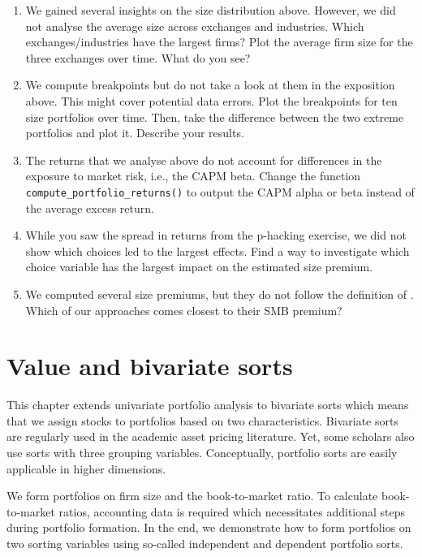 \documentclass[
]{book}
\providecommand{\tightlist}{%
  \setlength{\itemsep}{0pt}\setlength{\parskip}{0pt}}
\begin{document}
\begin{enumerate}
\def\labelenumi{\arabic{enumi}.}
\tightlist
\item
  We gained several insights on the size distribution above. However, we did not analyse the average size across exchanges and industries. Which exchanges/industries have the largest firms? Plot the average firm size for the three exchanges over time. What do you see?
\item
  We compute breakpoints but do not take a look at them in the exposition above. This might cover potential data errors. Plot the breakpoints for ten size portfolios over time. Then, take the difference between the two extreme portfolios and plot it. Describe your results.
\item
  The returns that we analyse above do not account for differences in the exposure to market risk, i.e., the CAPM beta. Change the function \texttt{compute\_portfolio\_returns()} to output the CAPM alpha or beta instead of the average excess return.
\item
  While you saw the spread in returns from the p-hacking exercise, we did not show which choices led to the largest effects. Find a way to investigate which choice variable has the largest impact on the estimated size premium.
\item
  We computed several size premiums, but they do not follow the definition of \citet{Fama1993}. Which of our approaches comes closest to their SMB premium?
\end{enumerate}

\hypertarget{value-and-bivariate-sorts}{%
\chapter{Value and bivariate sorts}\label{value-and-bivariate-sorts}}

This chapter extends univariate portfolio analysis to bivariate sorts which means that we assign stocks to portfolios based on two characteristics. Bivariate sorts are regularly used in the academic asset pricing literature. Yet, some scholars also use sorts with three grouping variables. Conceptually, portfolio sorts are easily applicable in higher dimensions.

We form portfolios on firm size and the book-to-market ratio. To calculate book-to-market ratios, accounting data is required which necessitates additional steps during portfolio formation. In the end, we demonstrate how to form portfolios on two sorting variables using so-called independent and dependent portfolio sorts.
\end{document}
